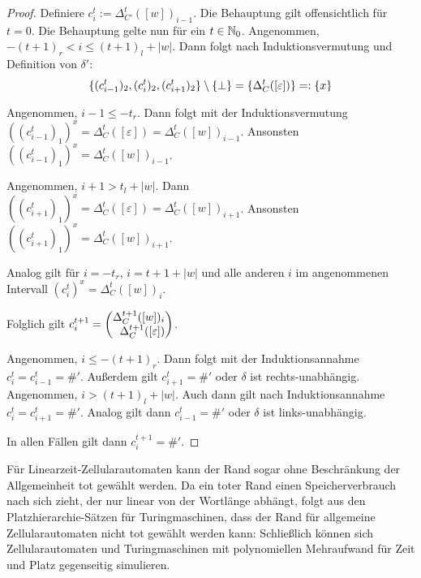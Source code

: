 \begin{proof}
    Definiere $c^t_i := \Delta_{C'}^t([w])_{i-1}$.
    Die Behauptung gilt offensichtlich für $t = 0$.
    Die Behauptung gelte nun für ein $t \in \mathbb{N}_0$.
    Angenommen, $-(t+1)_r < i \leq (t+1)_l + |w|$.
    Dann folgt nach Induktionsvermutung und Definition von $\delta'$: \[
    \{ { (c^t_{i-1})_2, (c^t_{i})_2, (c^t_{i+1})_2} \} \setminus \{ { \perp } \} = \{ { \Delta^t_{C}([\varepsilon])} \} =: \{ {x} \}
    \]
    
    Angenommen, $i - 1 \leq -t_r$. Dann folgt mit der Induktionsvermutung $((c^t_{i-1})_1)^x = \Delta^t_{C}([\varepsilon]) = \Delta^t_{C}([w])_{i-1}$.
    Ansonsten $((c^t_{i-1})_1)^x = \Delta^t_C([w])_{i-1}$.
    
    Angenommen, $i + 1 > t_l + |w|$. Dann $((c^t_{i+1})_1)^x = \Delta^t_{C}([\varepsilon]) = \Delta^t_{C}([w])_{i+1}$.
    Ansonsten $((c^t_{i+1})_1)^x = \Delta^t_C([w])_{i+1}$.
    
    Analog gilt für $i = -t_r$, $i = t + 1 + |w|$ und alle anderen $i$ im angenommenen Intervall $(c^t_{i})^x = \Delta^t_C([w])_i$.
    
    Folglich gilt $c^{t+1}_i = \Spvek{\Delta^{t+1}_C([w])_i; \Delta^{t+1}_{C}([\varepsilon])}$.
    
    Angenommen, $i \leq -(t+1)_r$. Dann folgt mit der Induktionsannahme $c^t_{i} = c^t_{i-1} = \#'$.
    Außerdem gilt $c^t_{i+1} = \#'$ oder $\delta$ ist rechts-unabhängig.
    Angenommen, $i > (t+1)_l + |w|$. Auch dann gilt nach Induktionsannahme $c^t_{i} = c^t_{i+1} = \#'$.
    Analog gilt dann $c^t_{i-1} = \#'$ oder $\delta$ ist links-unabhängig.
    
    In allen Fällen gilt dann $c^{t+1}_i = \#'$.
\end{proof}

Für Linearzeit-Zellularautomaten kann der Rand sogar ohne Beschränkung der Allgemeinheit tot gewählt werden.
Da ein toter Rand einen Speicherverbrauch nach sich zieht, der nur linear von der Wortlänge abhängt, folgt aus den Platzhierarchie-Sätzen für Turingmaschinen,
dass der Rand für allgemeine Zellularautomaten nicht tot gewählt werden kann:
Schließlich können sich Zellularautomaten und Turingmaschinen mit polynomiellen Mehraufwand für Zeit und Platz gegenseitig simulieren.

